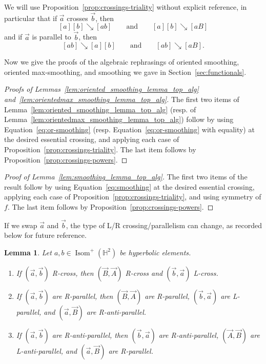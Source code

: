 \documentclass[11pt]{amsart}
\newcommand{\ora}[1]{\overrightarrow{#1}}
\numberwithin{equation}{section}
\numberwithin{figure}{section}
\newtheorem{lemma}[theorem]{Lemma}
\theoremstyle{definition}
\theoremstyle{plain}
\newcommand\bbH{\ensuremath{\mathbb{H}}}
\DeclareMathOperator{\Isom}{Isom}
\newcommand{\reducesto}{\mathrel{\searrow}}
\begin{document}
We will use Proposition~\ref{prop:crossings-triality} without explicit
reference, in particular that if $\ora{a}$ crosses $\ora{b}$, then
\[
  [a][b] \reducesto [ab]\qquad\text{and}\qquad[a][b] \reducesto [aB]
\]
and if $\ora{a}$ is parallel to $\ora{b}$, then
\[
  [ab] \reducesto [a][b]\qquad\text{and}\qquad[ab] \reducesto [aB].
\] 

Now we give the proofs of the algebraic rephrasings of oriented smoothing, oriented max-smoothing, and smoothing we gave in Section~\ref{sec:functionals}.

\begin{proof}[Proofs of Lemmas~\ref{lem:oriented_smoothing_lemma_top_alg} and~\ref{lem:orientedmax_smoothing_lemma_top_alg}]
The first two items of
Lemma~\ref{lem:oriented_smoothing_lemma_top_alg} (resp. of
Lemma~\ref{lem:orientedmax_smoothing_lemma_top_alg}) follow by using
Equation~\eqref{eq:or-smoothing} (resp. Equation~\eqref{eq:or-smoothing}
with equality) at the desired essential crossing, and applying each
case of Proposition~\ref{prop:crossings-triality}.
The last item follows by Proposition~\ref{prop:crossings-powers}.
\end{proof}

\begin{proof}[Proof of Lemma~\ref{lem:smoothing_lemma_top_alg}]
The first two items of the result follow by using Equation~\eqref{eq:smoothing} at the desired essential crossing, applying each case of Proposition~\ref{prop:crossings-triality}, and using symmetry of $f$.
The last item follows by Proposition~\ref{prop:crossings-powers}.
\end{proof}

If we swap $\ora{a}$ and $\ora{b}$, the type of L/R crossing/parallelism
can change, as recorded below for future reference.

\begin{lemma} Let $a,b\in \Isom^+(\bbH^2)$ be hyperbolic elements.
\begin{enumerate}
  \item If $(\ora{a},\ora{b})$ R-cross, then $(\ora{B},\ora{A})$
    R-cross and $(\ora{b},\ora{a})$ L-cross.
  \item If $(\ora{a},\ora{b})$ are R-parallel, then
    $(\ora{B},\ora{A})$ are R-parallel, $(\ora{b},\ora{a})$ are
    L-parallel, and $(\ora{a},\ora{B})$ are
    R-anti-parallel.
  \item If $(\ora{a},\ora{b})$ are R-anti-parallel, then
    $(\ora{b},\ora{a})$ are R-anti-parallel, $(\ora{A},\ora{B})$ are
    L-anti-parallel,
    and $(\ora{a},\ora{B})$
    are R-parallel.
\end{enumerate}
\end{lemma}
\end{document}
